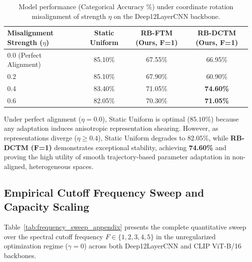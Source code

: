 \begin{table}[h]
\caption{Model performance (Categorical Accuracy \%) under coordinate rotation misalignment of strength $\eta$ on the Deep12LayerCNN backbone.}
\label{tab:misalignment_results_appendix}
\vskip 0.15in
\begin{center}
\begin{small}
\begin{sc}
\begin{tabular}{lccc}
\toprule
Misalignment Strength ($\eta$) & Static Uniform & RB-FTM (Ours, F=1) & RB-DCTM (Ours, F=1) \\
\midrule
0.0 (Perfect Alignment) & 85.10\% & 67.55\% & 66.95\% \\
0.2 & 85.10\% & 67.90\% & 60.90\% \\
0.4 & 83.40\% & 71.05\% & \textbf{74.60\%} \\
0.6 & 82.05\% & 70.30\% & \textbf{71.05\%} \\
\bottomrule
\end{tabular}
\end{sc}
\end{small}
\end{center}
\vskip -0.1in
\end{table}

Under perfect alignment ($\eta = 0.0$), Static Uniform is optimal ($85.10\%$) because any adaptation induces anisotropic representation shearing. However, as representations diverge ($\eta \ge 0.4$), Static Uniform degrades to $82.05\%$, while \textbf{RB-DCTM (F=1)} demonstrates exceptional stability, achieving \textbf{74.60\%} and proving the high utility of smooth trajectory-based parameter adaptation in non-aligned, heterogeneous spaces.


\subsection{Empirical Cutoff Frequency Sweep and Capacity Scaling}
\label{sec:appendix_frequency_sweep}

Table~\ref{tab:frequency_sweep_appendix} presents the complete quantitative sweep over the spectral cutoff frequency $F \in \{1, 2, 3, 4, 5\}$ in the unregularized optimization regime ($\gamma=0$) across both Deep12LayerCNN and CLIP ViT-B/16 backbones.

